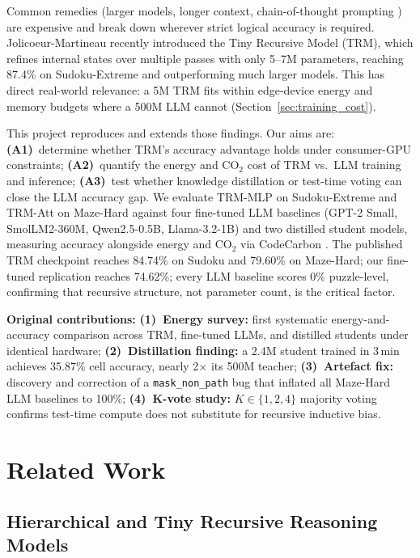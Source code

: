 \documentclass{article}
\begin{document}
Common remedies (larger models, longer context, chain-of-thought prompting \cite{Wei2022}) are expensive and break down wherever strict logical accuracy is required. Jolicoeur-Martineau  recently introduced the Tiny Recursive Model (TRM), which refines internal states over multiple passes with only 5--7M parameters, reaching 87.4\% on Sudoku-Extreme and outperforming much larger models. This has direct real-world relevance: a 5M TRM fits within edge-device energy and memory budgets where a 500M LLM cannot (Section~\ref{sec:training_cost}).

This project reproduces and extends those findings. Our aims are: \textbf{(A1)}~determine whether TRM's accuracy advantage holds under consumer-GPU constraints; \textbf{(A2)}~quantify the energy and CO$_2$ cost of TRM vs.\ LLM training and inference; \textbf{(A3)}~test whether knowledge distillation or test-time voting can close the LLM accuracy gap. We evaluate TRM-MLP on Sudoku-Extreme and TRM-Att on Maze-Hard against four fine-tuned LLM baselines (GPT-2 Small, SmolLM2-360M, Qwen2.5-0.5B, Llama-3.2-1B) and two distilled student models, measuring accuracy alongside energy and CO$_2$ via CodeCarbon \cite{Courty2023}. The published TRM checkpoint reaches 84.74\% on Sudoku and 79.60\% on Maze-Hard; our fine-tuned replication reaches 74.62\%; every LLM baseline scores 0\% puzzle-level, confirming that recursive structure, not parameter count, is the critical factor.

\textbf{Original contributions:} \textbf{(1)~Energy survey:} first systematic energy-and-accuracy comparison across TRM, fine-tuned LLMs, and distilled students under identical hardware; \textbf{(2)~Distillation finding:} a 2.4M student trained in 3\,min achieves 35.87\% cell accuracy, nearly 2$\times$ its 500M teacher; \textbf{(3)~Artefact fix:} discovery and correction of a \texttt{mask\_non\_path} bug that inflated all Maze-Hard LLM baselines to 100\%; \textbf{(4)~K-vote study:} $K\in\{1,2,4\}$ majority voting confirms test-time compute does not substitute for recursive inductive bias.


\section{Related Work}

\subsection{Hierarchical and Tiny Recursive Reasoning Models}
\end{document}
